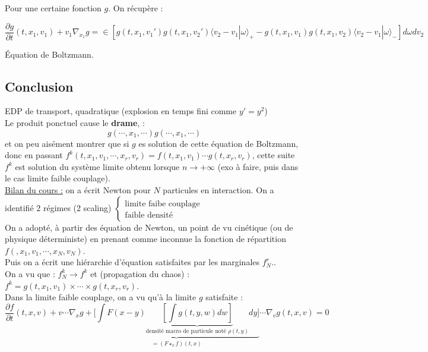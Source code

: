 \documentclass[12pt,a4paper]{article}
\begin{document}
	Pour une certaine fonction $g$. On récupère :
	
	\[
	\dfrac{\partial g}{\partial t}(t,x_1,v_1)+v_1\nabla_{x_1}g = \displaystyle\in\left[g(t,x_1,v_1')g(t,x_1,v_2')\langle v_2-v_1|\omega\rangle_+-g(t,x_1,v_1)g(t,x_1,v_2)\langle v_2-v_1|\omega\rangle_-\right]d\omega dv_2
	\]
	
	Équation de Boltzmann.
	
\subsection{Conclusion}
	
	
	EDP de transport, quadratique (explosion en temps fini comme $y' = y^2$) \\
	Le produit ponctuel cause le \textbf{drame},  :
	\[
	g(\cdots,x_1,\cdots)g(\cdots,x_1,\cdots)
	\]
	et on peu aisément montrer que si $g$ es solution de cette équation de Boltzmann, donc en passant $f^k(t,x_1,v_1,\cdots,x_r,v_r) = f(t,x_1,v_1)\cdots g(t,x_r,v_r)$, cette suite $f^k$ est solution du système limite obtenu lorsque $n \to + \infty$ (exo à faire, puis dans le cas limite faible couplage).\\
	\underline{Bilan du cours :} on a écrit Newton pour $N$ particules en interaction. On a identifié 2 régimes (2 scaling) $\begin{cases}
		\text{limite faibe couplage} \\
		\text{faible densité}
	\end{cases}$\\
	On a adopté, à partir des équation de Newton, un point de vu cinétique (ou de physique déterministe) en prenant comme inconnue la fonction de répartition $f(,x_1,v_1,\cdots,x_N,v_N)$.\\
	Puis on a écrit une hiérarchie d'équation satisfaites par les marginales $f_N^r$..\\
	On a vu que : $f_N^k \to f^k$ et (propagation du chaos) : $f^k = g(t,x_1,v_1)\times\cdots\times g(t,x_r,v_r)$.\\
	Dans la limite faible couplage, on a vu qu'à la limite $g$ satisfaite : 
	\[
	\dfrac{\partial f}{\partial t}(t,x,v) + v\cdots\nabla_x g + \underbrace{\Big[\displaystyle\int F(x-y)\underbrace{\left[\int g(t,y,w)dw\right]}_{\text{densité macro de particule noté }\rho(t,y)}dy\Big]}_{=(F\star_x f)(t,x)} \cdots \nabla_v g(t,x,v) = 0
	\]
	
\end{document}
